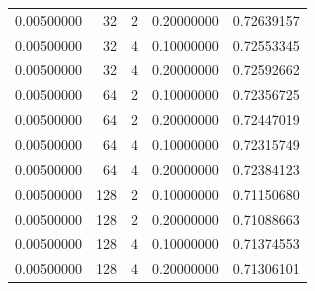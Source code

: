 \begin{table}[htbp]
{\begin{tabular}{rrrrr}
0.00500000 & 32 & 2 & 0.20000000 & 0.72639157 \\
0.00500000 & 32 & 4 & 0.10000000 & 0.72553345 \\
0.00500000 & 32 & 4 & 0.20000000 & 0.72592662 \\
0.00500000 & 64 & 2 & 0.10000000 & 0.72356725 \\
0.00500000 & 64 & 2 & 0.20000000 & 0.72447019 \\
0.00500000 & 64 & 4 & 0.10000000 & 0.72315749 \\
0.00500000 & 64 & 4 & 0.20000000 & 0.72384123 \\
0.00500000 & 128 & 2 & 0.10000000 & 0.71150680 \\
0.00500000 & 128 & 2 & 0.20000000 & 0.71088663 \\
0.00500000 & 128 & 4 & 0.10000000 & 0.71374553 \\
0.00500000 & 128 & 4 & 0.20000000 & 0.71306101 \\
\hline
\end{tabular}
}
\end{table}
